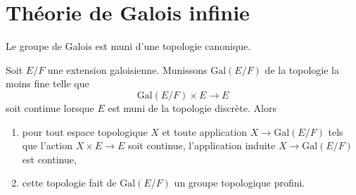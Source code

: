 \section{Théorie de Galois infinie}
\label{section-infinite-galois}

\noindent
Le groupe de Galois est muni d'une topologie canonique.

\begin{lemma}
\label{lemma-galois-profinite}
Soit $E/F$ une extension galoisienne. Munissons $\text{Gal}(E/F)$ de la topologie
la moins fine telle que
$$
\text{Gal}(E/F) \times E \longrightarrow E
$$
soit continue lorsque $E$ est muni de la topologie discrète. Alors
\begin{enumerate}
\item pour tout espace topologique $X$ et toute application $X \to \text{Gal}(E/F)$
tels que l'action $X \times E \to E$ soit continue, l'application induite
$X \to \text{Gal}(E/F)$ est continue,
\item cette topologie fait de $\text{Gal}(E/F)$
un groupe topologique profini.
\end{enumerate}
\end{lemma}

